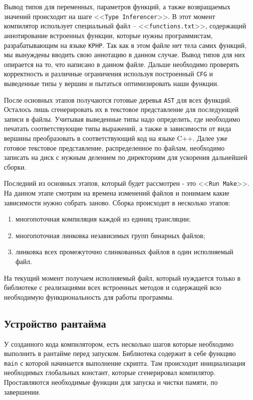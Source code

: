 Вывод типов для переменных, параметров функций, а также возвращаемых значений происходит на шаге <<\verb|Type Inferencer|>>.
В этот момент компилятор использует специальный файл -- <<\verb|functions.txt|>>, содержащий аннотирование встроенных функции, которые нужны программистам, разрабатывающим на языке \verb|KPHP|.
Так как в этом файле нет тела самих функций, мы вынуждены вводить свою аннотацию в данном случае.
Вывод типов для них опирается на то, что написано в данном файле.
Дальше необходимо проверять корректность и различные ограничения используя построенный \verb|CFG| и выведенные типы у вершин и пытаться оптимизировать наши функции.

После основных этапов получаются готовые деревья \verb|AST| для всех функций.
Осталось лишь сгенерировать их в текстовое представление для последующей записи в файлы.
Учитывая выведенные типы надо определить, где необходимо печатать соответствующие типы выражений, а также в зависимости от вида вершины преобразовать в соответствующий код на языке C++.
Далее уже готовое текстовое представление, распределенное по файлам, необходимо записать на диск с нужным делением по директориям для ускорения дальнейшей сборки.

Последний из основных этапов, который будет рассмотрен - это <<\verb|Run Make|>>.
На данном этапе смотрим на времена изменений файлов и понимаем какие зависимости нужно собрать заново.
Сборка происходит в несколько этапов:
\begin{enumerate}
  \item многопоточная компиляция каждой из единиц трансляции;
  \item многопоточная линковка независимых групп бинарных файлов;
  \item линковка всех промежуточно слинкованных файлов в один исполняемый файл.
\end{enumerate}

На текущий момент получаем исполняемый файл, который нуждается только в библиотеке с реализациями всех встроенных методов и содержащей всю необходимую функциональность для работы программы.

\subsection{Устройство рантайма}
\label{sec2:runtime_principle}
У созданного кода компилятором, есть несколько шагов которые необходимо выполнить в рантайме перед запуском.
Библиотека содержит в себе функцию \verb|main| с которой начинается выполнение скрипта.
Там происходит инициализация необходимых глобальных констант, которые сгенерировал компилятор.
Проставляются необходимые функции для запуска и чистки памяти, по завершении.

